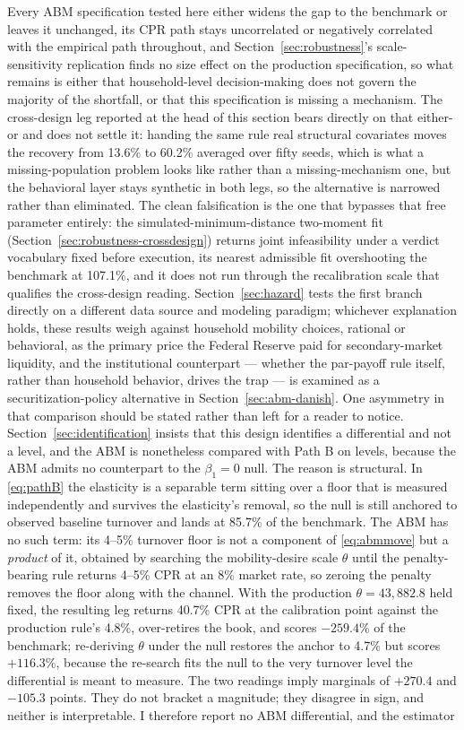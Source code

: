 \documentclass[12pt]{article}
\begin{document}
Every ABM specification tested here either widens the gap to the benchmark or leaves it unchanged, its CPR path stays uncorrelated or negatively correlated with the empirical path throughout, and Section~\ref{sec:robustness}'s scale-sensitivity replication finds no size effect on the production specification, so what remains is either that household-level decision-making does not govern the majority of the shortfall, or that this specification is missing a mechanism. The cross-design leg reported at the head of this section bears directly on that either-or and does not settle it: handing the same rule real structural covariates moves the recovery from 13.6\% to 60.2\% averaged over fifty seeds, which is what a missing-population problem looks like rather than a missing-mechanism one, but the behavioral layer stays synthetic in both legs, so the alternative is narrowed rather than eliminated. The clean falsification is the one that bypasses that free parameter entirely: the simulated-minimum-distance two-moment fit (Section~\ref{sec:robustness-crossdesign}) returns joint infeasibility under a verdict vocabulary fixed before execution, its nearest admissible fit overshooting the benchmark at 107.1\%, and it does not run through the recalibration scale that qualifies the cross-design reading. Section~\ref{sec:hazard} tests the first branch directly on a different data source and modeling paradigm; whichever explanation holds, these results weigh against household mobility choices, rational or behavioral, as the primary price the Federal Reserve paid for secondary-market liquidity, and the institutional counterpart --- whether the par-payoff rule itself, rather than household behavior, drives the trap --- is examined as a securitization-policy alternative in Section~\ref{sec:abm-danish}. One asymmetry in that comparison should be stated rather than left for a reader to notice. Section~\ref{sec:identification} insists that this design identifies a differential and not a level, and the ABM is nonetheless compared with Path B on levels, because the ABM admits no counterpart to the $\beta_1 = 0$ null. The reason is structural. In \eqref{eq:pathB} the elasticity is a separable term sitting over a floor that is measured independently and survives the elasticity's removal, so the null is still anchored to observed baseline turnover and lands at 85.7\% of the benchmark. The ABM has no such term: its 4--5\% turnover floor is not a component of \eqref{eq:abmmove} but a \emph{product} of it, obtained by searching the mobility-desire scale $\theta$ until the penalty-bearing rule returns 4--5\% CPR at an 8\% market rate, so zeroing the penalty removes the floor along with the channel. With the production $\theta = 43{,}882.8$ held fixed, the resulting leg returns 40.7\% CPR at the calibration point against the production rule's 4.8\%, over-retires the book, and scores $-259.4$\% of the benchmark; re-deriving $\theta$ under the null restores the anchor to 4.7\% but scores $+116.3$\%, because the re-search fits the null to the very turnover level the differential is meant to measure. The two readings imply marginals of $+270.4$ and $-105.3$ points. They do not bracket a magnitude; they disagree in sign, and neither is interpretable. I therefore report no ABM differential, and the estimator 
\end{document}
